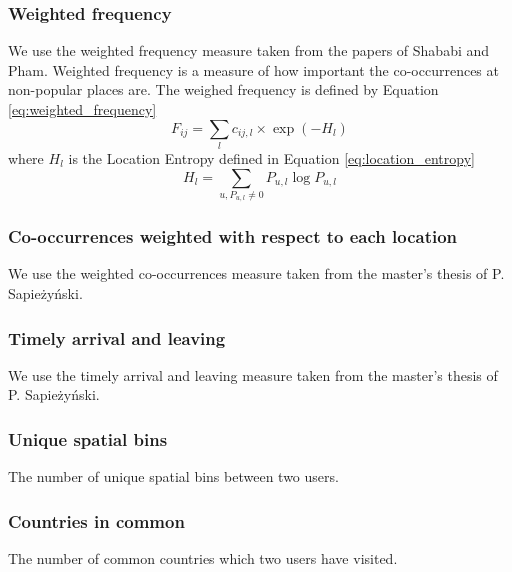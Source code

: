 \subsubsection{Weighted frequency}
We use the weighted frequency measure taken from the papers of Shababi and Pham\cite{iRWRfSD}\cite{AEBMtISSfSD}.
Weighted frequency is a measure of how important the co-occurrences at non-popular places are.
The weighed frequency is defined by Equation \ref{eq:weighted_frequency}
\begin{equation}
\label{eq:weighted_frequency}
F_{ij}=\sum\limits_{l}c_{ij,l} \times \exp(-H_l)
\end{equation}
where $H_l$ is the Location Entropy defined in Equation \ref{eq:location_entropy}
\begin{equation}
\label{eq:location_entropy}
H_l = \sum\limits_{u, P_{u,l}\neq0} P_{u,l}\log P_{u,l}
\end{equation}
\subsubsection{Co-occurrences weighted with respect to each location}
We use the weighted co-occurrences measure taken from the master's thesis of P. Sapieżyński\cite{IMM2013-06556}.

\subsubsection{Timely arrival and leaving}
We use the timely arrival and leaving measure taken from the master's thesis of P. Sapieżyński\cite{IMM2013-06556}.

\subsubsection{Unique spatial bins}
The number of unique spatial bins between two users.

\subsubsection{Countries in common}
The number of common countries which two users have visited.

\section{}
